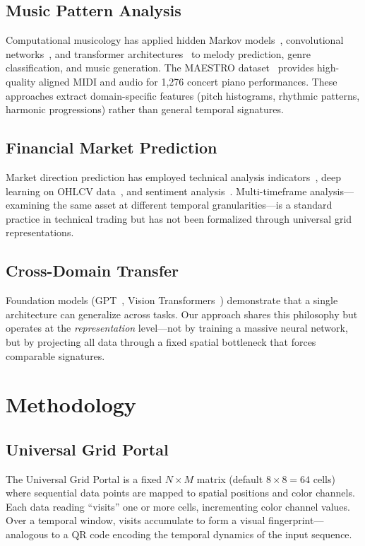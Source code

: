 \documentclass[11pt,a4paper]{article}
\begin{document}
\subsection{Music Pattern Analysis}
Computational musicology has applied hidden Markov models~\citep{rabiner1989},
convolutional networks~\citep{wavenet2016}, and transformer
architectures~\citep{musictransformer2019} to melody prediction, genre classification,
and music generation. The MAESTRO dataset~\citep{maestro2019} provides high-quality
aligned MIDI and audio for 1,276 concert piano performances. These approaches extract
domain-specific features (pitch histograms, rhythmic patterns, harmonic progressions)
rather than general temporal signatures.

\subsection{Financial Market Prediction}
Market direction prediction has employed technical analysis indicators~\citep{murphy1999},
deep learning on OHLCV data~\citep{bao2017}, and sentiment analysis~\citep{xu2018stock}.
Multi-timeframe analysis---examining the same asset at different temporal
granularities---is a standard practice in technical trading but has not been formalized
through universal grid representations.

\subsection{Cross-Domain Transfer}
Foundation models (GPT~\citep{brown2020}, Vision Transformers~\citep{dosovitskiy2021})
demonstrate that a single architecture can generalize across tasks. Our approach shares
this philosophy but operates at the \emph{representation} level---not by training a
massive neural network, but by projecting all data through a fixed spatial bottleneck
that forces comparable signatures.

\section{Methodology}

\subsection{Universal Grid Portal}
The Universal Grid Portal is a fixed $N \times M$ matrix (default $8\times8 = 64$ cells)
where sequential data points are mapped to spatial positions and color channels. Each
data reading ``visits'' one or more cells, incrementing color channel values. Over a
temporal window, visits accumulate to form a visual fingerprint---analogous to a QR code
encoding the temporal dynamics of the input sequence.
\end{document}
